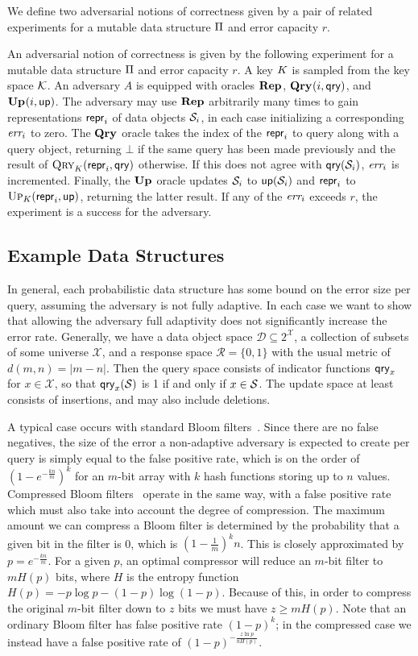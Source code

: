 We define two adversarial notions of correctness given by a pair of related experiments for a mutable data structure $\mathrm{\Pi}$ and error capacity $r$.

An adversarial notion of correctness is given by the following experiment for a mutable data structure $\mathrm{\Pi}$ and error capacity $r$. A key $K$ is sampled from the key space $\mathcal{K}$. An adversary $A$ is equipped with oracles $\mathbf{Rep}\hspace{0.5pt}$, $\mathbf{Qry}\hspace{0.5pt}(i,\mathsf{qry})$, and $\mathbf{Up}\hspace{0.5pt}(i,\mathsf{up})$. The adversary may use $\mathbf{Rep}\hspace{0.5pt}$ arbitrarily many times to gain representations $\mathsf{repr}_i$ of data objects $\mathcal{S}_i$, in each case initializing a corresponding $\textit{err}_i$ to zero. The $\mathbf{Qry}\hspace{0.5pt}$ oracle takes the index of the $\mathsf{repr}_i$ to query along with a query object, returning $\bot$ if the same query has been made previously and the result of $\textsc{Qry}_K(\mathsf{repr}_i,\mathsf{qry})$ otherwise. If this does not agree with $\mathsf{qry}(\mathcal{S}_i)$, $\textit{err}_i$ is incremented. Finally, the $\mathbf{Up}\hspace{0.5pt}$ oracle updates $\mathcal{S}_i$ to $\mathsf{up}(\mathcal{S}_i)$ and $\mathsf{repr}_i$ to $\textsc{Up}_K(\mathsf{repr}_i,\mathsf{up})$, returning the latter result. If any of the $\textit{err}_i$ exceeds $r$, the experiment is a success for the adversary.

\subsection{Example Data Structures}

In general, each probabilistic data structure has some bound on the error size per query, assuming the adversary is not fully adaptive. In each case we want to show that allowing the adversary full adaptivity does not significantly increase the error rate. Generally, we have a data object space $\mathcal{D} \subseteq 2^\mathcal{X}$, a collection of subsets of some universe $\mathcal{X}$, and a response space $\mathcal{R} = \{0,1\}$ with the usual metric of $d(m,n) = |m-n|$. Then the query space consists of indicator functions $\mathsf{qry}_x$ for $x \in \mathcal{X}$, so that $\mathsf{qry}_x(\mathcal{S})$ is 1 if and only if $x \in \mathcal{S}$. The update space at least consists of insertions, and may also include deletions.

A typical case occurs with standard Bloom filters~\cite{bloomfilter}. Since there are no false negatives, the size of the error a non-adaptive adversary is expected to create per query is simply equal to the false positive rate, which is on the order of $(1-e^{-\frac{kn}{m}})^k$ for an $m$-bit array with $k$ hash functions storing up to $n$ values. Compressed Bloom filters~\cite{xxx} operate in the same way, with a false positive rate which must also take into account the degree of compression. The maximum amount we can compress a Bloom filter is determined by the probability that a given bit in the filter is 0, which is $\left(1-\frac{1}{m}\right)^kn$. This is closely approximated by $p = e^{-\frac{kn}{m}}$. For a given $p$, an optimal compressor will reduce an $m$-bit filter to $mH(p)$ bits, where $H$ is the entropy function $H(p) = -p\log p - (1-p)\log(1-p)$. Because of this, in order to compress the original $m$-bit filter down to $z$ bits we must have $z \ge mH(p)$. Note that an ordinary Bloom filter has false positive rate $(1-p)^k$; in the compressed case we instead have a false positive rate of $(1-p)^{-\frac{z \ln p}{nH(p)}}$.

